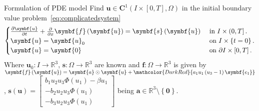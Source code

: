 \documentclass[
    8pt,
    aspectratio=1610,
    c,
    intlimits,
		handout,
    leqno,
    professionalfonts,
]{beamer}
\begin{document}
\begin{frame}
	\begin{block}{Formulation of PDE model}
		Find
		\begin{math}
			\symbf{u}\in
			\symbf{C}^{1}\left(I\times\left[0,T\right],\Omega\right)
		\end{math}
		in the initial boundary value problem~\eqref{eq:complicatedsystem}
		\begin{equation}\label{eq:complicatedsystem}
			\begin{cases}
				\diffp{\symbf{u}}{t}+\diffp{}{x}\symbf{f}\left(\symbf{u}\right)=
				\symbf{s}\left(\symbf{u}\right) & \text{ in }I\times\left(0,T\right].          \\
				\symbf{u}                                                      =
				\symbf{u}_{0}                   & \text{ on }I\times\left\{t=0\right\}.        \\
				\symbf{u}                                                       =
				\symbf{0}                       & \text{ on }\partial I\times\left[0,T\right].
			\end{cases}
		\end{equation}
		Where
		\begin{math}
			\symbf{u}_{0}\colon I\to
			\mathbb{R}^{3}
		\end{math},
		\begin{math}
			\symbf{s}\colon\Omega\to
			\mathbb{R}^{3}
		\end{math}
		are known and
		\begin{math}
			\symbf{f}\colon\Omega\to
			\mathbb{R}^{3}
		\end{math}
		is given by
		\begin{math}
			\symbf{f}\left(\symbf{u}\right)=
			\symbf{a}\odot\symbf{u}+
			\mathcolor{DarkRed}{a_{1}u_{1}\left(u_{3}-1\right)\symbf{e_{1}}}
		\end{math},
		\begin{math}
			\symbf{s}\left(\symbf{u}\right)=
			\begin{bmatrix}
				b_{1}u_{2}u_{3}\Phi\left(u_{1}\right)-\beta u_{1} \\
				-b_{2}u_{2}u_{3}\Phi\left(u_{1}\right)            \\
				-b_{3}u_{2}u_{3}\Phi\left(u_{1}\right)
			\end{bmatrix}
		\end{math}
		being $\symbf{a}\in\mathbb{R}^{3}\setminus\left\{\symbf{0}\right\}$.
	\end{block}
\end{frame}
\end{document}
